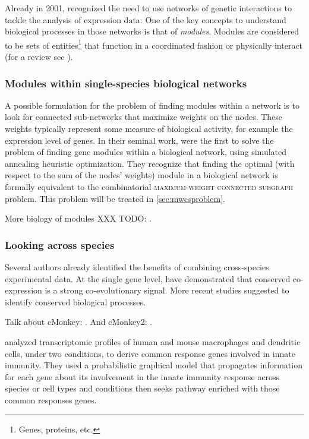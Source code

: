 	Already in 2001, \textcite{altman2001whole} recognized the need to use networks of genetic interactions to tackle the analysis of expression data.
	One of the key concepts to understand biological processes in those networks is that of \emph{modules}.
	Modules are considered to be sets of entities\footnote{Genes, proteins, etc.} that function in a coordinated fashion or physically interact (for a review see \textcite{mitra2013integrative}).

		\subsubsection{Modules within single-species biological networks}
		\label{subsec:moduledisc}

		A possible formulation for the problem of finding modules within a network is to look for connected sub-networks that maximize weights on the nodes.
		These weights typically represent some measure of biological activity, for example the expression level of genes.
		In their seminal work, \textcite{ideker2002discovering} were the first to solve the problem of finding gene modules within a biological network, using simulated annealing heuristic optimization.
		They recognize that finding the optimal (with respect to the sum of the nodes' weights) module in a biological network is formally equivalent to the combinatorial \textsc{maximum-weight connected subgraph} problem.
		This problem will be treated in \cref{sec:mwcsproblem}.

		More biology of modules XXX TODO: \parencites{dittrich2008identifying}{yamamoto2009better}{backes2012integer}{mitra2013integrative}.

		\subsubsection{Looking across species}

		Several authors already identified the benefits of combining cross-species experimental data.
		At the single gene level, \textcite{noort2003predicting} have demonstrated that conserved co-expression is a strong co-evolutionary signal.
		More recent  studies suggested to identify conserved biological processes.

		Talk about cMonkey: \parencite{reiss2006integrated}.
		And cMonkey2: \parencite{reiss2015cmonkey2}.

		\Textcite{lu2009cross} analyzed transcriptomic profiles of human and mouse macrophages and dendritic cells, under two conditions, to derive common response genes involved in innate immunity.
		They used a probabilistic graphical model that propagates information for each gene about its involvement in the innate immunity response across species or cell types and conditions then seeks pathway enriched with those common responses genes.

